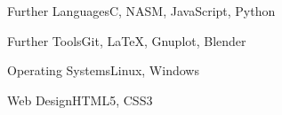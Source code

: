 \documentclass[a4paper,10pt]{cv}
\begin{document}
      \begin{multicols}{2}
        \begin{cvSkillGroup}{Further Languages}{C, NASM, JavaScript, Python}
        \end{cvSkillGroup}
        \begin{cvSkillGroup}{Further Tools}{Git, LaTeX, Gnuplot, Blender}
        \end{cvSkillGroup}
        \begin{cvSkillGroup}{Operating Systems}{Linux, Windows}
        \end{cvSkillGroup}
        \begin{cvSkillGroup}{Web Design}{HTML5, CSS3}
        \end{cvSkillGroup}

\end{multicols}
\end{document}
